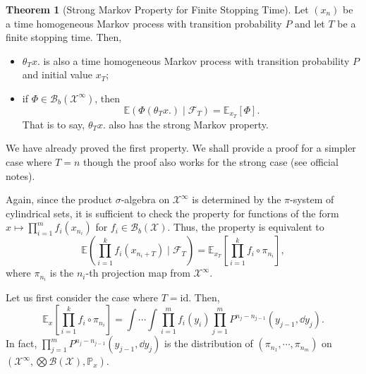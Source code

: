 \documentclass[]{article}
\theoremstyle{definition}
\newtheorem{theorem}{Theorem}
\theoremstyle{definition}
\begin{document}
\begin{theorem}[Strong Markov Property for Finite Stopping Time]
  Let \((x_n)\) be a time homogeneous Markov process with transition probability \(P\) 
  and let \(T\) be a finite stopping time. Then,
  \begin{itemize}
    \item \(\theta_T x.\) is also a time homogeneous Markov process with transition probability 
      \(P\) and initial value \(x_T\);
    \item if \(\Phi \in \mathcal{B}_b(\mathcal{X}^\infty)\), then 
    \[\mathbb{E}(\Phi(\theta_T x.) \mid \mathcal{F}_T) = \mathbb{E}_{x_T}[\Phi].\]
    That is to say, \(\theta_T x.\) also has the strong Markov property.
  \end{itemize}
\end{theorem}

We have already proved the first property. We shall provide a proof for a simpler 
case where \(T = n\) though the proof also works for the strong case (see official notes).

Again, since the product \(\sigma\)-algebra on \(\mathcal{X}^\infty\) is determined 
by the \(\pi\)-system of cylindrical sets, it is sufficient to check the property 
for functions of the form \(x \mapsto \prod_{i = 1}^m f_i(x_{n_i})\) for 
\(f_i \in \mathcal{B}_b(\mathcal{X})\). Thus, the property is equivalent to 
\[\mathbb{E}\left(\prod_{i = 1}^k f_i(x_{n_i + T}) \mid \mathcal{F}_T\right) = 
  \mathbb{E}_{x_T}\left[\prod_{i = 1}^k f_i \circ \pi_{n_i}\right],\]
where \(\pi_{n_i}\) is the \(n_i\)-th projection map from \(\mathcal{X}^\infty\).

Let us first consider the case where \(T = \text{id}\). Then, 
\[\mathbb{E}_{x}\left[\prod_{i = 1}^k f_i \circ \pi_{n_i}\right] = 
  \int \cdots \int \prod_{i = 1}^m f_i(y_i) \prod_{j = 1}^m
  P^{n_j - n_{j - 1}}(y_{j - 1}, \dd y_j).\]
In fact, \(\prod_{j = 1}^m P^{n_j - n_{j - 1}}(y_{j - 1}, \dd y_j)\) is the distribution 
of \((\pi_{n_1}, \cdots, \pi_{n_m})\) on 
\((\mathcal{X}^\infty, \bigotimes \mathcal{B}(\mathcal{X}), \mathbb{P}_x)\).
\end{document}
